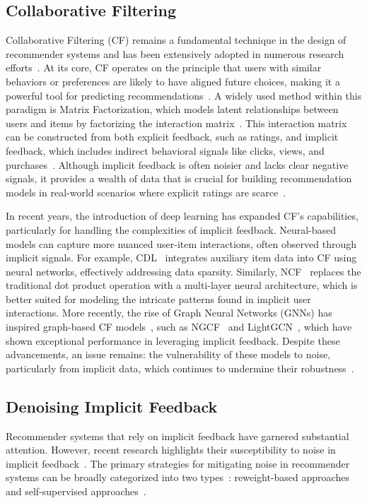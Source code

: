 \subsection{Collaborative Filtering}
Collaborative Filtering (CF) remains a fundamental technique in the design of recommender systems and has been extensively adopted in numerous research efforts~\cite{schafer2007collaborative, covington2016deep, ying2018graph}. At its core, CF operates on the principle that users with similar behaviors or preferences are likely to have aligned future choices, making it a powerful tool for predicting recommendations~\cite{koren2021advances}. A widely used method within this paradigm is Matrix Factorization, which models latent relationships between users and items by factorizing the interaction matrix~\cite{koren2009matrix}. This interaction matrix can be constructed from both explicit feedback, such as ratings, and implicit feedback, which includes indirect behavioral signals like clicks, views, and purchases~\cite{hu2008collaborative}. Although implicit feedback is often noisier and lacks clear negative signals, it provides a wealth of data that is crucial for building recommendation models in real-world scenarios where explicit ratings are scarce~\cite{hu2008collaborative}.

In recent years, the introduction of deep learning has expanded CF’s capabilities, particularly for handling the complexities of implicit feedback. Neural-based models can capture more nuanced user-item interactions, often observed through implicit signals. For example, CDL~\cite{wang2015collaborative} integrates auxiliary item data into CF using neural networks, effectively addressing data sparsity. Similarly, NCF~\cite{he2017neural} replaces the traditional dot product operation with a multi-layer neural architecture, which is better suited for modeling the intricate patterns found in implicit user interactions. More recently, the rise of Graph Neural Networks (GNNs) has inspired graph-based CF models~\cite{wang2020disentangled, xia2022hypergraph, wu2022graph}, such as NGCF~\cite{wang2019neural} and LightGCN~\cite{he2020lightgcn}, which have shown exceptional performance in leveraging implicit feedback. Despite these advancements, an issue remains: the vulnerability of these models to noise, particularly from implicit data, which continues to undermine their robustness~\cite{zhang2023robust}.

\subsection{Denoising Implicit Feedback}
Recommender systems that rely on implicit feedback have garnered substantial attention. However, recent research highlights their susceptibility to noise in implicit feedback~\cite{zhang2023robust, wang2023tutorial}. The primary strategies for mitigating noise in recommender systems can be broadly categorized into two types~\cite{zhang2023robust}: reweight-based approaches~\cite{wang2021denoising, he2024double, lin2023autodenoise, wang2023efficient, gao2022selfguided, ye2023towards, tian2022learning} and self-supervised approaches~\cite{yang2022knowledge, wu2021selfsupervised, wang2022learning}.

